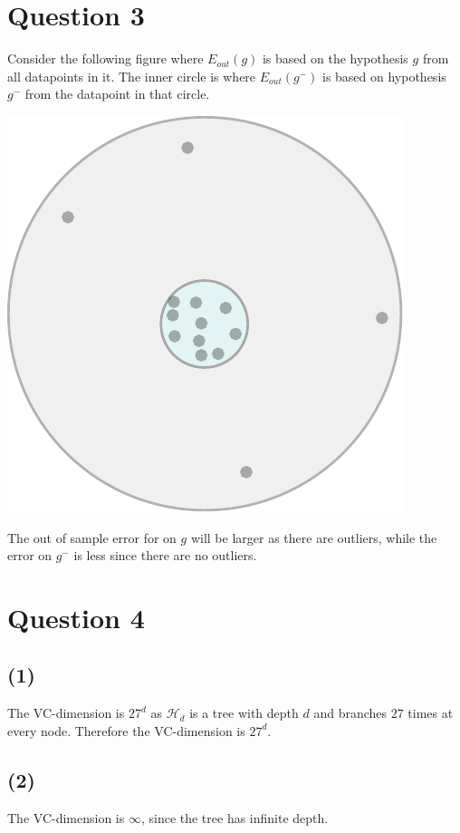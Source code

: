 \documentclass[a4paper]{article}
\begin{document}
\section*{Question 3}
Consider the following figure where $E_{out}(g)$ is based on the hypothesis $g$ from all datapoints in it. The inner circle is where $E_{out}(g^-)$ is based on hypothesis $g^-$ from the datapoint in that circle. 
\begin{center}
\includegraphics{drawing.pdf}
\end{center}
The out of sample error for on $g$ will be larger as there are outliers, while the error on $g^-$ is less since there are no outliers.

\newpage
\section*{Question 4}
\subsection*{(1)}
The VC-dimension is $27^d$ as $\mathcal{H}_d$ is a tree with depth $d$ and branches $27$ times at every node. Therefore the VC-dimension is $27^d$.


\subsection*{(2)}
The VC-dimension is $\infty$, since the tree has infinite depth.
\end{document}
